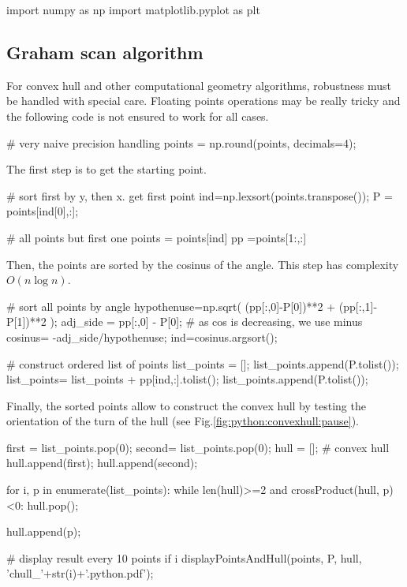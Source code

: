 \def\QRCODE{TB_IPR_TUT.IMG.convexhull_pythonqrcode.png}
\def\QRPAGE{http://www.iptutorials.science/tree/master/TB_IPR/TUT.IMG.convexhull/python}


\begin{python}
import numpy as np
import matplotlib.pyplot as plt
\end{python}


\subsection{Graham scan algorithm}
For convex hull and other computational geometry algorithms, robustness must be handled with special care. Floating points operations may be really tricky and the following code is not ensured to work for all cases.


\begin{python}
# very naive precision handling
points = np.round(points, decimals=4);
\end{python}

The first step is to get the starting point.
\begin{python}
# sort first by y, then x. get first point
ind=np.lexsort(points.transpose());
P = points[ind[0],:];    

# all points but first one
points = points[ind]
pp =points[1:,:]
\end{python}

Then, the points are sorted by the cosinus of the angle. This step has complexity $O(n\log n)$.
\begin{python}
# sort all points by angle
hypothenuse=np.sqrt( (pp[:,0]-P[0])**2 + (pp[:,1]-P[1])**2 );
adj_side = pp[:,0] - P[0];
# as cos is decreasing, we use minus
cosinus= -adj_side/hypothenuse;
ind=cosinus.argsort(); 

# construct ordered list of points
list_points = [];
list_points.append(P.tolist());
list_points= list_points + pp[ind,:].tolist();
list_points.append(P.tolist());
\end{python}

Finally, the sorted points allow to construct the convex hull by testing the orientation of the turn of the hull (see Fig.\ref{fig:python:convexhull:pause}). 
\begin{python}
first = list_points.pop(0);
second= list_points.pop(0);
hull = []; # convex hull
hull.append(first);
hull.append(second);

for i, p in enumerate(list_points):
    while len(hull)>=2 and crossProduct(hull, p)<0: 
        hull.pop();
        
    hull.append(p);  
    
    # display result every 10 points
    if i%
        displayPointsAndHull(points, P, hull, 'chull_'+str(i)+'.python.pdf');

\end{python}

